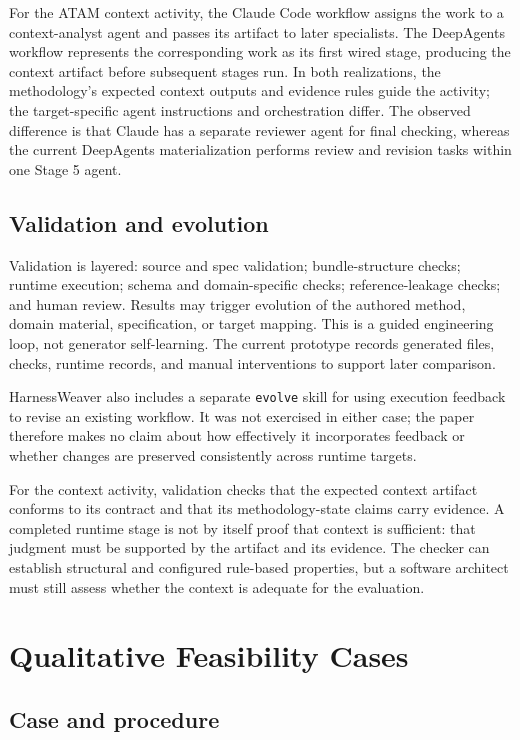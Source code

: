 \documentclass[10pt,conference]{IEEEtran}
\begin{document}
For the ATAM context activity, the Claude Code workflow assigns the work to a context-analyst agent and passes its artifact to later specialists. The DeepAgents workflow represents the corresponding work as its first wired stage, producing the context artifact before subsequent stages run. In both realizations, the methodology's expected context outputs and evidence rules guide the activity; the target-specific agent instructions and orchestration differ. The observed difference is that Claude has a separate reviewer agent for final checking, whereas the current DeepAgents materialization performs review and revision tasks within one Stage 5 agent.

\subsection{Validation and evolution}

Validation is layered: source and spec validation; bundle-structure checks; runtime execution; schema and domain-specific checks; reference-leakage checks; and human review. Results may trigger evolution of the authored method, domain material, specification, or target mapping. This is a guided engineering loop, not generator self-learning. The current prototype records generated files, checks, runtime records, and manual interventions to support later comparison.

HarnessWeaver also includes a separate \texttt{evolve} skill for using execution feedback to revise an existing workflow. It was not exercised in either case; the paper therefore makes no claim about how effectively it incorporates feedback or whether changes are preserved consistently across runtime targets.

For the context activity, validation checks that the expected context artifact conforms to its contract and that its methodology-state claims carry evidence. A completed runtime stage is not by itself proof that context is sufficient: that judgment must be supported by the artifact and its evidence. The checker can establish structural and configured rule-based properties, but a software architect must still assess whether the context is adequate for the evaluation.

\section{Qualitative Feasibility Cases}

\subsection{Case and procedure}
\end{document}
